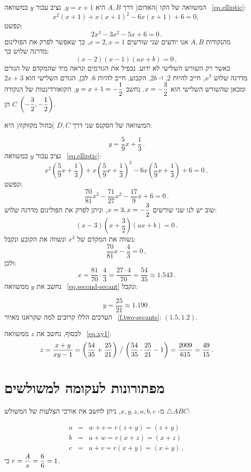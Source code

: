 המשוואה של הקו )האדום( דרך 
$A,B$
היא
$y=x+1$. 
נציב עבור 
$y$
במשוואה%
~\ref{eq.elliptic}:
\[
x^2(x+1) + x(x+1)^2 -6x(x+1) +6 =0,\,
\]
ונפשט:
\[
2x^3 -3x^2 -5x +6 =0\,.
\]
מהנקודות
$A,B$
אנו יודעים שני שורשים
$x=2,x=1$,
כך שאפשר לפרק את הפולינום מדרגה שלוש כך:
\[
(x-2)(x-1)(ax+b)=0\,,
\]
כאשר רק השורש השלישי לא ידוע. נכפיל את הגורמים ונראה מיד שהמקדם של הגורם מדרגה שלוש
$x^3$,
חייב להיות
$2$,
ו-%
$2b$,
הקבוע, חייב להיות
$6$.
לכן, הגורם השלישי הוא
$2x+3$
ומכאן שהשורש השלישי הוא
$x=-\displaystyle\frac{3}{2}$.
נחשב
$y=x+1=-\displaystyle\frac{1}{2}$.
הקואורדינטות של הנקודה
$C$
הן
$\left(-\displaystyle\frac{3}{2},-\displaystyle\frac{1}{2}\right)$.

המשוואה של הסקנס שני דרך
$D,C$
)כחול מקווקוו( היא:

\begin{equation}
y = \frac{5}{9}x + \frac{1}{3}\,.\label{eq.second-secant}
\end{equation}
נציב עבור 
$y$
במשוואה 
~\ref{eq.elliptic}:
\[
x^2\left(\frac{5}{9}x + \frac{1}{3}\right) + x\left(\frac{5}{9}x + \frac{1}{3}\right)^2 -6x\left(\frac{5}{9}x + \frac{1}{3}\right) +6 =0\,,
\]
ונפשט:
\[
\frac{70}{81}x^3 - \frac{71}{27}x^2 - \frac{17}{9}x +6 =0\,.
\]
שוב יש לנו שני שורשים
$x=3,x=-\displaystyle\frac{3}{2}$,
וניתן לפרק את הפולינום מדרגה שלוש:
\[
(x-3)\left(x+\frac{3}{2}\right)(ax+b)=0\,.
\]
נשווה את המקדם של 
$x^3$
ונשווה את הקובע ונקבל:
\[
\frac{70}{81}x - \frac{4}{3}=0\,,
\]
ולכן:
\[
x=\frac{81}{70}\cdot \frac{4}{3}= \frac{27\cdot 4}{70} = \frac{54}{35}\approx 1.543\,.
\]
נחשב את
$y$
ממשוואה~%
\ref{eq.second-secant}
ונקבל:

\[
y=\frac{25}{21}\approx 1.190\,.
\]
הערכים הללו קרובים למה שקראנו מאיור~%
\ref{f.two-secants}:
$(1.5,1.2)$.

לבסוף, נחשב את
$z$
ממשוואה
~\ref{eq.xy1}:
\[
z=\frac{x+y}{xy-1}=%
\left(\disfrac{54}{35} + \disfrac{25}{21}\right)%
 \, / \,%
\left(\disfrac{54}{35}\cdot\disfrac{25}{21}-1\right)=%
\frac{2009}{615} = \frac{49}{15}\,.
\]



\section{מפתורונות לעקומה למשולשים}
מ-%
$x,y,z,a,b,c$, 
ניתן לחשב את אורכי הצלעות של המשולש
$\triangle ABC$:

\begin{eqnarray*}
a&=&w+v = r(z+y)=(z+y)\\
b&=&u+w= r(x+z)=(x+z)\\
c&=&u+v=r(x+y)=(x+y)\,,
\end{eqnarray*}
כי
$r=\displaystyle\frac{A}{s}=\displaystyle\frac{6}{6}=1$.

